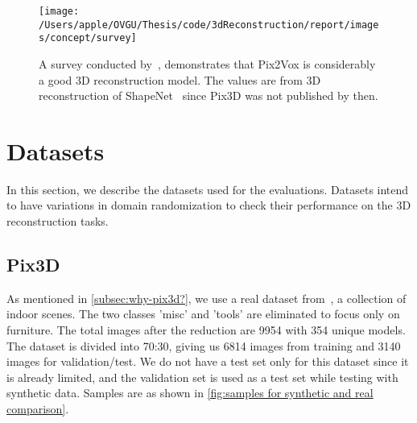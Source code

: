 %

\begin{figure}[ht]
    \centering
    \texttt{[image: /Users/apple/OVGU/Thesis/code/3dReconstruction/report/images/concept/survey]}
    \caption{A survey conducted by~\cite{Han2021ImageBased3O}, demonstrates that Pix2Vox is considerably a good 3D reconstruction model.
    The values are from 3D reconstruction of ShapeNet~\cite{chang2015shapenet} since Pix3D was not published by then.}
    \label{fig:survey on 3d reconstruction}
\end{figure}


\section{Datasets}\label{sec:datasets}
In this section, we describe the datasets used for the evaluations.
Datasets intend to have variations in domain randomization to check their performance on the 3D reconstruction tasks.

\subsection{Pix3D}\label{subsec:pix3d}
As mentioned in \autoref{subsec:why-pix3d?}, we use a real dataset from~\cite{pix3d}, a collection of indoor scenes.
The two classes ’misc’ and ’tools’ are eliminated to focus only on furniture.
The total images after the reduction are 9954 with 354 unique models.
The dataset is divided into 70:30, giving us 6814 images from training and 3140 images for validation/test.
We do not have a test set only for this dataset since it is already limited, and the validation set is used as a test set while testing with synthetic data.
Samples are as shown in \autoref{fig:samples for synthetic and real comparison}.

